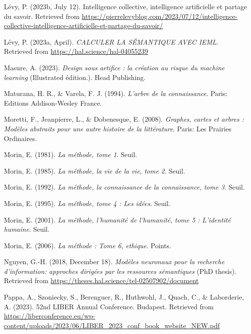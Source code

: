 \documentclass[
  a4paper,
  DIV=11,
  numbers=noendperiod]{scrreprt}
\newlength{\cslhangindent}
\newenvironment{CSLReferences}[2] %
 {\begin{list}{}{%
  \setlength{\itemindent}{0pt}
  \setlength{\leftmargin}{0pt}
  \setlength{\parsep}{0pt}
  \ifodd #1
   \setlength{\leftmargin}{\cslhangindent}
   \setlength{\itemindent}{-1\cslhangindent}
  \fi
  \setlength{\itemsep}{#2\baselineskip}}}
 {\end{list}}
\begin{document}
\begin{CSLReferences}{1}{0}
Lévy, P. (2023b, July 12). Intelligence collective, intelligence
artificielle et partage du savoir. Retrieved from
\url{https://pierrelevyblog.com/2023/07/12/intelligence-collective-intelligence-artificielle-et-partage-du-savoir/}

Lévy, P. (2023a, April). \emph{CALCULER LA SÉMANTIQUE AVEC IEML}.
Retrieved from \url{https://hal.science/hal-04055239}

Masure, A. (2023). \emph{Design sous artifice : la création au risque du
machine learning} (Illustrated édition.). Head Publishing.

Maturana, H. R., \& Varela, F. J. (1994). \emph{L'arbre de la
connaissance}. Paris: Editions Addison-Wesley France.

Moretti, F., Jeanpierre, L., \& Dobenesque, E. (2008). \emph{Graphes,
cartes et arbres : Modèles abstraits pour une autre histoire de la
littérature}. Paris: Les Prairies Ordinaires.

Morin, E. (1981). \emph{La méthode, tome 1}. Seuil.

Morin, E. (1985). \emph{La méthode, la vie de la vie, tome 2}. Seuil.

Morin, E. (1992). \emph{La méthode, la connaissance de la connaissance,
tome 3}. Seuil.

Morin, E. (1995). \emph{La méthode, tome 4 : Les idées}. Seuil.

Morin, E. (2001). \emph{La méthode, l'humanité de l'humanité, tome 5 :
L'identité humaine}. Seuil.

Morin, E. (2006). \emph{La méthode : Tome 6, ethique}. Points.

Nguyen, G.-H. (2018, December 18). \emph{Modèles neuronaux pour la
recherche d'information: approches dirigées par les ressources
sémantiques} (PhD thesis). Retrieved from
\url{https://theses.hal.science/tel-02507902/document}

Pappa, A., Szoniecky, S., Berenguer, R., Huthwohl, J., Quach, C., \&
Laborderie, A. (2023). 52nd LIBER Annual Conference. Budapest. Retrieved
from
\url{https://liberconference.eu/wp-content/uploads/2023/06/LIBER_2023_conf_book_website_NEW.pdf}


\end{CSLReferences}
\end{document}
